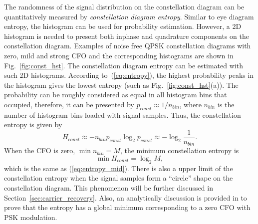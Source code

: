\documentclass[journal,comsoc]{IEEEtran}
\begin{document}
The randomness of the signal distribution on the constellation diagram can be quantitatively measured by \textit{constellation diagram entropy}.
Similar to eye diagram entropy, the histogram can be used for probability estimation.
However, a 2D histogram is needed to present both inphase and quadrature components on the constellation diagram.
Examples of noise free QPSK constellation diagrams with zero, mild and strong CFO and the corresponding histograms are shown in Fig.~\ref{fig:const_hst}.
The constellation diagram entropy can be estimated with such 2D histograms.
According to~(\ref{eq:entropy}), the highest probability peaks in the histogram gives the lowest entropy (such as Fig.~\ref{fig:const_hst}(a)).
The probability can be roughly considered as equal in all histogram bins that occupied, 
therefore, it can be presented by \(p_{const} \approx {1}/{n_{bin}}\), where \(n_{bin}\) is the number of histogram bins loaded with signal samples.
Thus, the constellation entropy is given by
\begin{equation}
H_{const} \approx - n_{bin} p_{const} \log_2 {p_{const}} \approx -\log_2 {\frac{1}{n_{bin}}}.
\label{eq:const_ent}
\end{equation}
When the CFO is zero, \(\min{n_{bin}}=M\),  the minimum constellation entropy is
\begin{equation}
\min{H_{const}=\log_2 {M}},
\end{equation}
which is the same as (\ref{eq:entropy_mid}).
There is also a upper limit of the constellation entropy when the signal samples form a ``circle'' shape on the constellation diagram.
% 
% 
This phenomenon will be further discussed in Section~\ref{sec:carrier_recovery}.
Also, an analytically discussion is provided in \cite{Pedzisz2006} to prove that the entropy has a global minimum corresponding to a zero CFO with PSK modulation.
\end{document}
